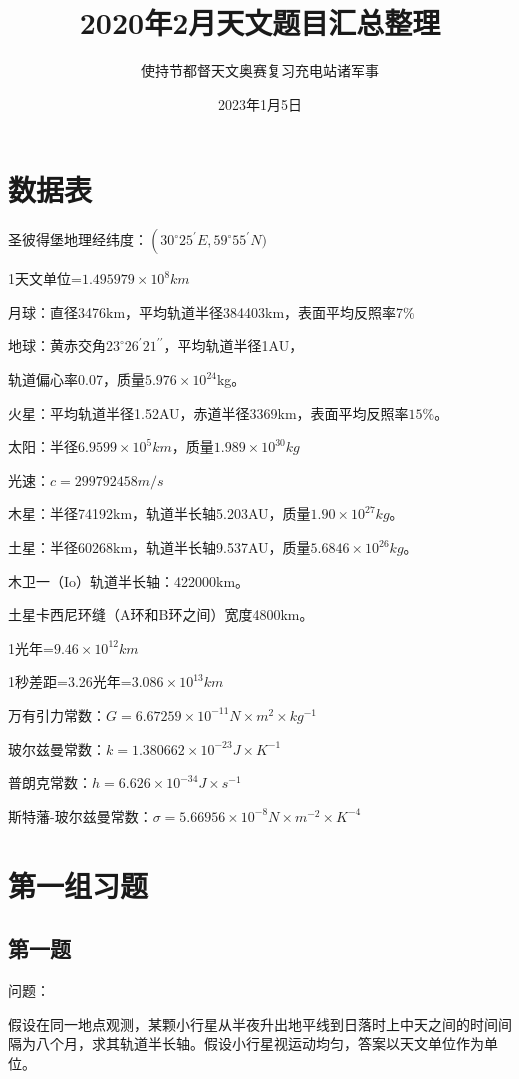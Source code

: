\documentclass[a4paper,12pt]{report}
\title{2020年2月天文题目汇总整理}
\author{使持节都督天文奥赛复习充电站诸军事}
\date{2023年1月5日}
\begin{document}
\maketitle

\chapter{数据表}
圣彼得堡地理经纬度：$\left(30^\circ25^\prime E,59^\circ55^\prime N)\right.$

1天文单位=$1.495979\times{10^{8}} km$

月球：直径3476km，平均轨道半径384403km，表面平均反照率7$\%$

地球：黄赤交角$ 23^\circ 26^\prime 21^{\prime\prime}$，平均轨道半径1AU，

轨道偏心率0.07，质量$ 5.976\times{10^{24}} $kg。

火星：平均轨道半径1.52AU，赤道半径3369km，表面平均反照率$15\%$。

太阳：半径$ 6.9599\times{10^{5}}km $，质量$ 1.989\times{10^{30}}kg $

光速：$c=299792458 m/s$

木星：半径74192km，轨道半长轴5.203AU，质量$1.90\times{10^{27}}kg$。

土星：半径60268km，轨道半长轴9.537AU，质量$5.6846\times{10^{26}}kg$。

木卫一（Io）轨道半长轴：422000km。

土星卡西尼环缝（A环和B环之间）宽度4800km。

1光年=$9.46\times{10^{12}}km$

1秒差距=3.26光年=$3.086\times{10^{13}}km$

万有引力常数：$G=6.67259\times{10^{-11}}N\times{m{^2}}\times{kg^{-1}}$

玻尔兹曼常数：$k=1.380662\times{10^{-23}}J\times{K^{-1}}$ 

普朗克常数：$h=6.626\times{10^{-34}}J\times{s^{-1}}$

斯特藩-玻尔兹曼常数：$\sigma=5.66956\times{10^{-8}}N\times{m^{-2}}\times{K^{-4}}$

\chapter{第一组习题}
\section{第一题}
\noindent 问题：

假设在同一地点观测，某颗小行星从半夜升出地平线到日落时上中天之间的时间间隔为八个月，求其轨道半长轴。假设小行星视运动均匀，答案以天文单位作为单位。
\end{document}
